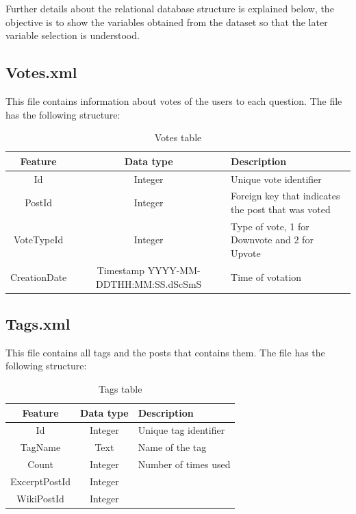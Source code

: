 \documentclass[11pt]{book} %
\begin{document}
    Further details about the relational database structure is explained below, the objective is to show the variables obtained from the dataset so that the later variable selection is understood.

    \subsection{Votes.xml}

      This file contains information about votes of the users to each question. The file has the following structure:

      \begin{table}[!ht]
        \centering
        \begin{tabular}{|c|c|p{}|}
          \hline
          Feature & Data type & Description \\ \hline
          Id & Integer & Unique vote identifier \\ \hline
          PostId & Integer & Foreign key that indicates the post that was voted \\ \hline
          VoteTypeId & Integer & Type of vote, 1 for Downvote and 2 for Upvote \\ \hline
          CreationDate & Timestamp YYYY-MM-DDTHH:MM:SS.dScSmS & Time of votation \\ \hline
        \end{tabular}
        \caption{Votes table}
        \label{tab:votes}
      \end{table}

\newpage

    \subsection{Tags.xml}

      This file contains all tags and the posts that contains them. The file has the following structure:

      \begin{table}[!ht]
        \centering
        \begin{tabular}{|c|c|p{}|}
          \hline

          Feature & Data type & Description \\ \hline
          Id & Integer & Unique tag identifier \\ \hline
          TagName & Text & Name of the tag \\ \hline
          Count & Integer & Number of times used \\ \hline
          ExcerptPostId & Integer & \\ \hline
          WikiPostId & Integer & \\

          \hline
        \end{tabular}
        \caption{Tags table}
        \label{tab:tags}
      \end{table}
\end{document}
